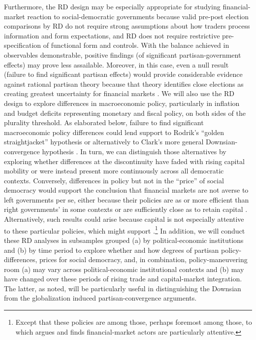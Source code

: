 \documentclass[12pt]{article}
\begin{document}
Furthermore, the RD design may be especially appropriate for studying financial-market reaction to social-democratic governments because valid pre-post election comparisons by RD do not require strong assumptions about how traders process information and form expectations, and RD does not require restrictive pre-specification of functional form and controls. With the balance achieved in observables demonstrable, positive findings (of significant partisan-government effects) may prove less assailable. Moreover, in this case, even a null result (failure to find significant partisan effects) would provide considerable evidence against rational partisan theory because that theory identifies close elections as creating greatest uncertainty for financial markets \citep{Alesina1997, Bachman1992}. We will also use the RD design to explore differences in macroeconomic policy, particularly in inflation and budget deficits representing monetary and fiscal policy, on both sides of the plurality threshold. As elaborated below, failure to find significant macroeconomic policy differences could lend support to Rodrik's ``golden straightjacket'' hypothesis \citep{Rodrik2000} or alternatively to Clark's more general Downsian-convergence hypothesis \citep{Clark2003}. In turn, we can distinguish those alternatives by exploring whether differences at the discontinuity have faded with rising capital mobility or were instead present more continuously across all democratic contexts. Conversely, differences in policy but not in the ``price'' of social democracy would support the conclusion that financial markets are not averse to left governments per se, either because their policies are as or more efficient than right governments' in some contexts \citep{Garrett1998} or are sufficiently close as to retain capital \citep{Boix1998}. Alternatively, such results could arise because capital is not especially attentive to these particular policies, which might support \citet{Mosley2000}.\footnote{Except that these policies are among those, perhaps foremost among those, to which \citet{Mosley2000} argues and finds financial-market actors are particularly attentive.} In addition, we will conduct these RD analyses in subsamples grouped (a) by political-economic institutions and (b) by time period to explore whether and how degrees of partisan policy-differences, prices for social democracy, and, in combination, policy-maneuvering room (a) may vary across political-economic institutional contexts and (b) may have changed over these periods of rising trade and capital-market integration. The latter, as noted, will be particularly useful in distinguishing the Downsian from the globalization induced partisan-convergence arguments. 
\end{document}
